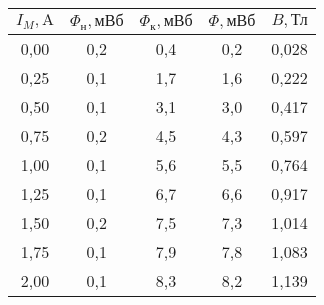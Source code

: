 \begin{tabular}{ccccc}
\toprule
$I_M, \text{A}$ & $\Phi_\text{н}, \text{мВб}$ &  $\Phi_\text{к}, \text{мВб}$ &  $\Phi, \text{мВб}$ &  $B, \text{Тл}$ \\
\midrule
0,00 & 0,2 & 0,4 & 0,2 & 0,028 \\
0,25 & 0,1 & 1,7 & 1,6 & 0,222 \\
0,50 & 0,1 & 3,1 & 3,0 & 0,417 \\
0,75 & 0,2 & 4,5 & 4,3 & 0,597 \\
1,00 & 0,1 & 5,6 & 5,5 & 0,764 \\
1,25 & 0,1 & 6,7 & 6,6 & 0,917 \\
1,50 & 0,2 & 7,5 & 7,3 & 1,014 \\
1,75 & 0,1 & 7,9 & 7,8 & 1,083 \\
2,00 & 0,1 & 8,3 & 8,2 & 1,139 \\
\bottomrule
\end{tabular}
